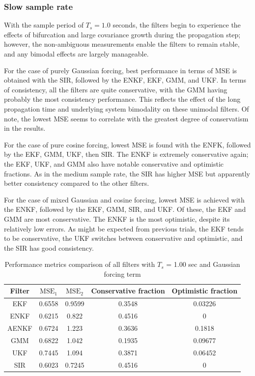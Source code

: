 \documentclass[]{article}
\begin{document}
\subsubsection{Slow sample rate}

With the sample period of $T_s = 1.0$ seconds, the filters begin to experience the effects of bifurcation and large covariance growth during the propagation step; however, the non-ambiguous measurements enable the filters to remain stable, and any bimodal effects are largely manageable. 

For the case of purely Gaussian forcing, best performance in terms of MSE is obtained with the SIR, followed by the ENKF, EKF, GMM, and UKF.  In terms of consistency, all the filters are quite conservative, with the GMM having probably the most consistency performance. This reflects the effect of the long propagation time and underlying system bimodality on these unimodal filters. Of note, the lowest MSE seems to correlate with the greatest degree of conservatism in the results.

For the case of pure cosine forcing, lowest MSE is found with the ENFK, followed by the EKF, GMM, UKF, then SIR. The ENKF is extremely conservative again; the EKF, UKF, and GMM also have notable conservative and optimistic fractions. As in the medium sample rate, the SIR has higher MSE but apparently better consistency compared to the other filters.

For the case of mixed Gaussian and cosine forcing, lowest MSE is achieved with the ENKF, followed by the EKF, GMM, SIR, and UKF. Of these, the EKF and GMM are most conservative. The ENKF is the most optimistic, despite its relatively low errors. As might be expected from previous trials, the EKF tends to be conservative, the UKF switches between conservative and optimistic, and the SIR has good consistency.

\begin{table}[h!]
\centering
\begin{tabular}{|c|c|c|c|c|}
\hline
Filter & $\mathrm{MSE}_1$ & $\mathrm{MSE}_2$ & Conservative fraction & Optimistic fraction \\
\hline
EKF &   0.6558 &   0.9599 &   0.3548 &  0.03226 \\
\hline
ENKF &   0.6215 &    0.822 &   0.4516 &        0 \\
\hline
AENKF &   0.6724 &    1.223 &   0.3636 &   0.1818 \\
\hline
GMM &   0.6822 &    1.042 &   0.1935 &  0.09677 \\
\hline
UKF &   0.7445 &    1.094 &   0.3871 &  0.06452 \\
\hline
SIR &   0.6023 &   0.7245 &   0.4516 &        0 \\
\hline
\end{tabular}
\caption{Performance metrics comparison of all filters with $T_s$ = 1.00 sec and Gaussian forcing term}
\label{table:compare_case_1_sample_2}
\end{table}
\end{document}
